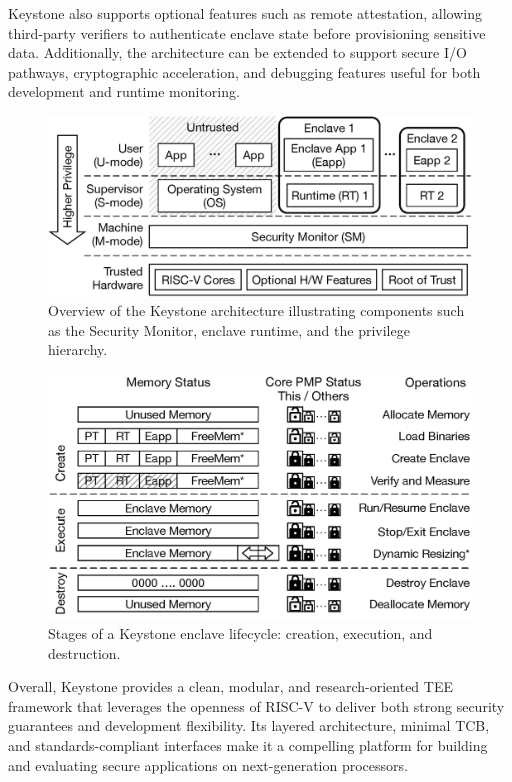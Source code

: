 Keystone also supports optional features such as remote attestation, allowing third-party verifiers to authenticate enclave state before provisioning sensitive data. Additionally, the architecture can be extended to support secure I/O pathways, cryptographic acceleration, and debugging features useful for both development and runtime monitoring.

\begin{figure}[htbp]
\centering
\includegraphics[width=0.9\linewidth]{figures/keystone_overview.png}
\caption{Overview of the Keystone architecture illustrating components such as the Security Monitor, enclave runtime, and the privilege hierarchy.}
\label{fig:keystone_overview}
\end{figure}

\begin{figure}[htbp]
\centering
\includegraphics[width=0.9\linewidth]{figures/enclave_lifecycle.png}
\caption{Stages of a Keystone enclave lifecycle: creation, execution, and destruction.}
\label{fig:enclave_lifecycle}
\end{figure}

Overall, Keystone provides a clean, modular, and research-oriented TEE framework that leverages the openness of RISC-V to deliver both strong security guarantees and development flexibility. Its layered architecture, minimal TCB, and standards-compliant interfaces make it a compelling platform for building and evaluating secure applications on next-generation processors.

